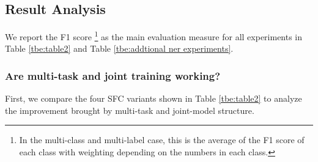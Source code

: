 \subsection{Result Analysis}
We  report  the F1 score \footnote{In the multi-class and multi-label case, this
is  the  average  of  the F1 score of each class with weighting depending on the
numbers  in  each class.} as the main evaluation measure for all experiments in
Table \ref{tbe:table2} and Table \ref{tbe:addtional ner experiments}.

\subsubsection*{Are multi-task and joint training working?} 
First, we compare the four  SFC  variants shown in Table \ref{tbe:table2} to analyze the improvement
brought  by  multi-task  and  joint-model  structure. 

\begin{table}
  \begin{centering}
      
  \end{centering}
  \caption{F1 scores on two task-specific datasets for joint training of sentence classification and NER in chatbot domain under low resource. For both FRAMES and ATIS, we set up various few-shot settings(10/20/50 samples per intent) while keeping the original test set.}
  \label{tbe:addtional ner experiments}
\end{table}

